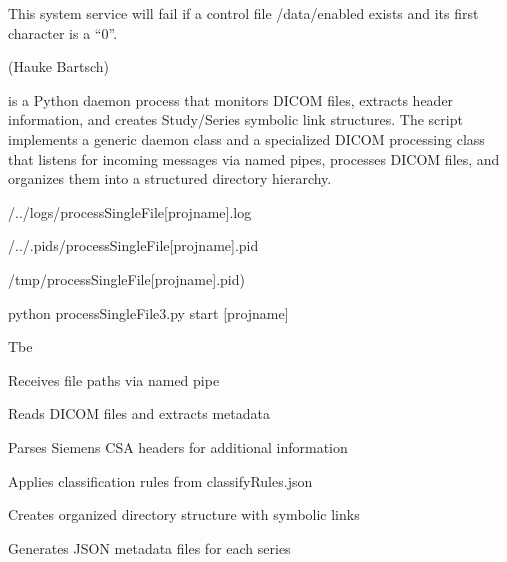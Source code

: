 \documentclass[letterpaper,10pt,english]{sphinxmanual}
\begin{document}
\sphinxAtStartPar
This system service will fail if a control file /data/enabled exists and  its first character is a “0”.

\sphinxAtStartPar
(Hauke Bartsch)

\sphinxstepscope

\sphinxAtStartPar
{} is a Python daemon process that monitors DICOM files, extracts header information, and creates Study/Series symbolic link structures. The script implements a generic daemon class and a specialized DICOM processing class that listens for incoming messages via named pipes, processes DICOM files, and organizes them into a structured directory hierarchy.

\sphinxAtStartPar
{}

\begin{DUlineblock}{0em}
\item[] \sphinxhyphen{} 
\item[] \sphinxhyphen{} 
\item[] \sphinxhyphen{}  /../logs/processSingleFile{[}projname{]}.log
\item[] \sphinxhyphen{} 
\item[]
\begin{DUlineblock}{\DUlineblockindent}
\item[] \sphinxhyphen{}        /../.pids/processSingleFile{[}projname{]}.pid
\item[] \sphinxhyphen{}       /tmp/processSingleFile{[}projname{]}.pid)
\end{DUlineblock}
\item[] \sphinxhyphen{}  python processSingleFile3.py start {[}projname{]}
\item[] \sphinxhyphen{}  Tbe
\end{DUlineblock}

\sphinxAtStartPar
{}

\begin{DUlineblock}{0em}
\item[] \sphinxhyphen{} Receives file paths via named pipe
\item[] \sphinxhyphen{} Reads DICOM files and extracts metadata
\item[] \sphinxhyphen{} Parses Siemens CSA headers for additional information
\item[] \sphinxhyphen{} Applies classification rules from classifyRules.json
\item[] \sphinxhyphen{} Creates organized directory structure with symbolic links
\item[] \sphinxhyphen{} Generates JSON metadata files for each series
\end{DUlineblock}
\end{document}
